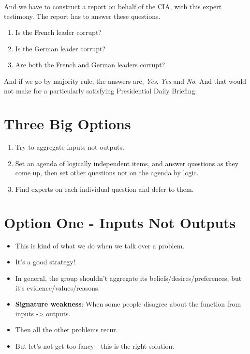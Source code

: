 \documentclass[11pt,]{article}
\providecommand{\tightlist}{%
  \setlength{\itemsep}{0pt}\setlength{\parskip}{0pt}}
\begin{document}
And we have to construct a report on behalf of the CIA, with this expert
testimony. The report has to answer these questions.

\begin{enumerate}
\def\labelenumi{\arabic{enumi}.}
\tightlist
\item
  Is the French leader corrupt?
\item
  Is the German leader corrupt?
\item
  Are both the French and German leaders corrupt?
\end{enumerate}

And if we go by majority rule, the answers are, \emph{Yes}, \emph{Yes}
and \emph{No}. And that would not make for a particularly satisfying
Presidential Daily Briefing.

\hypertarget{three-big-options}{%
\section{Three Big Options}\label{three-big-options}}

\begin{enumerate}
\def\labelenumi{\arabic{enumi}.}
\tightlist
\item
  Try to aggregate inputs not outputs.
\item
  Set an agenda of logically independent items, and answer questions as
  they come up, then set other questions not on the agenda by logic.
\item
  Find experts on each individual question and defer to them.
\end{enumerate}

\hypertarget{option-one---inputs-not-outputs}{%
\section{Option One - Inputs Not
Outputs}\label{option-one---inputs-not-outputs}}

\begin{itemize}
\tightlist
\item
  This is kind of what we do when we talk over a problem.
\item
  It's a good strategy!
\item
  In general, the group shouldn't aggregate its
  beliefs/desires/preferences, but it's evidence/values/reasons.
\item
  \textbf{Signature weakness}: When some people disagree about the
  function from inputs -\textgreater{} outputs.
\item
  Then all the other problems recur.
\item
  But let's not get too fancy - this is the right solution.
\end{itemize}
\end{document}
